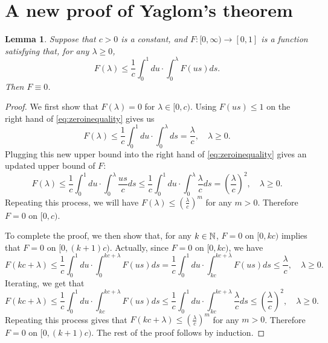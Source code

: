 \documentclass[12pt]{amsart}
\newtheorem{lem}[thm]{Lemma}
\numberwithin{equation}{section}
\newcommand{\expr}[1]{\left( #1 \right)}
\begin{document}
\section{A new proof of Yaglom's theorem}
\label{sec:anewproofofyaglomslaw}
\begin{lem}
\label{lem:zeroinequality}
    Suppose that $c>0$ is a constant, and $F:[0,\infty)\to [0,1]$  is
    a function satisfying that, for any $\lambda\geq 0$,
\begin{equation}
\label{eq:zeroinequality}
	    F(\lambda)
	\leq
	    \frac{1}{c}\int_0^1du
	\cdot
	    \int_0^\lambda F(us)ds.
\end{equation}
    Then $F\equiv 0$.
\end{lem}
\begin{proof}
	We first show that $F(\lambda)=0$ for $\lambda \in [0,c)$.
    Using  $F(us)\leq 1$ on the right hand of \eqref{eq:zeroinequality} gives us
\begin{equation*}
        F(\lambda)
    \leq
        \frac{1}{c}\int_0^1du
    \cdot
	    \int_0^\lambda ds
	=
	    \frac{\lambda}{c},
	\quad
		\lambda\geq 0.
\end{equation*}
	Plugging this new upper bound into the right hand of \eqref{eq:zeroinequality} gives an updated upper bound of $F$:
\begin{equation*}
        F(\lambda)
    \leq
        \frac{1}{c}\int_0^1du
    \cdot
	    \int_0^\lambda \frac{us}{c}ds
	\leq
        \frac{1}{c}\int_0^1du
    \cdot
	    \int_0^\lambda \frac{\lambda}{c}ds
	=
	    \expr{\frac{\lambda}{c}}^2,
	\quad
		\lambda\geq 0.
\end{equation*}
    Repeating this process, we will have $F(\lambda)\leq (\frac{\lambda}{c})^m$ for any $m>0$. Therefore $F=0$ on $[0,c)$.
\par
    To complete the proof, we then show that, for any $k\in\mathbb N$, $F=0$ on $[0,kc)$ implies that $F=0$ on $[0,(k+1)c)$.
	Actually, since $F=0$ on $[0,kc)$, we have
\begin{equation*}
	    F\expr{kc+\lambda}
	\leq
		\frac{1}{c}\int_0^1 du\cdot\int_0^{kc+\lambda}F(us)ds
	=
		\frac{1}{c}\int_0^1du\cdot\int_{kc}^{kc+\lambda}
	    F(us)ds\leq\frac{\lambda}{c}, \quad \lambda\geq 0.
\end{equation*}
	Iterating, we get that
\begin{equation*}
	    F(kc+\lambda)
	\leq
	   	    \frac{1}{c}\int_0^1du\cdot\int_{kc}^{kc+\lambda} F(us)ds
	\leq
	    	    \frac{1}{c}\int_0^1du\cdot\int_{kc}^{kc+\lambda} \frac{\lambda}{c}ds
	\leq
		\expr{\frac{\lambda}{c}}^2, \quad \lambda\geq 0.
\end{equation*}
	Repeating this process gives that $F(kc+\lambda)\leq (\frac{\lambda}{c})^m$ for any $m>0$. Therefore $F=0$ on $[0,(k+1)c)$. The rest of the proof follows by induction.
\end{proof}
\end{document}
